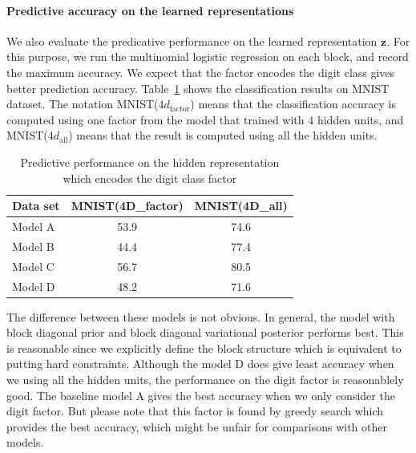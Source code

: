 \paragraph{Predictive accuracy on the learned representations}
We also evaluate the predicative performance on the learned representation $\mathbf{z}$. For this purpose, we run the multinomial logistic regression on each block, and record the maximum accuracy. We expect that the factor encodes the digit class gives better prediction accuracy. Table~\ref{tab:regression} shows the classification results on MNIST dataset. The notation MNIST($4d_{\text{factor}}$) means that the classification accuracy is computed using one factor from the model that trained with $4$ hidden units, and MNIST($4d_{\text{all}}$) means that the result is computed using all the hidden units.

\begin{table}[htb]
	\begin{center}
		\begin{small}
			\begin{sc}
				\begin{tabular}{lcc}
					\hline
					Data set & MNIST(4D\_factor) & MNIST(4D\_all)  \\
					\hline
					Model A& 53.9  & 74.6\\
					Model B &44.4 & 77.4\\
					Model C & 56.7 &80.5\\
					Model D & 48.2 & 71.6\\
					\hline
				\end{tabular}
			\end{sc}
		\end{small}
        \vspace{0.2cm}
		\caption{Predictive performance on the hidden representation which encodes the digit class factor}
\vspace{-0.5cm}		
\label{tab:regression}
	\end{center}
\end{table}

The difference between these models is not obvious. In general, the model with block diagonal prior and block diagonal variational posterior performs best. This is reasonable since we explicitly define the block structure which is equivalent to putting hard constraints. Although the model D does give least accuracy when we using all the hidden units, the performance on the digit factor is reasonablely good. The baseline model A gives the best accuracy when we only consider the digit factor. But please note that this factor is found by greedy search which provides the best accuracy, which might be unfair for comparisons with other models. 


